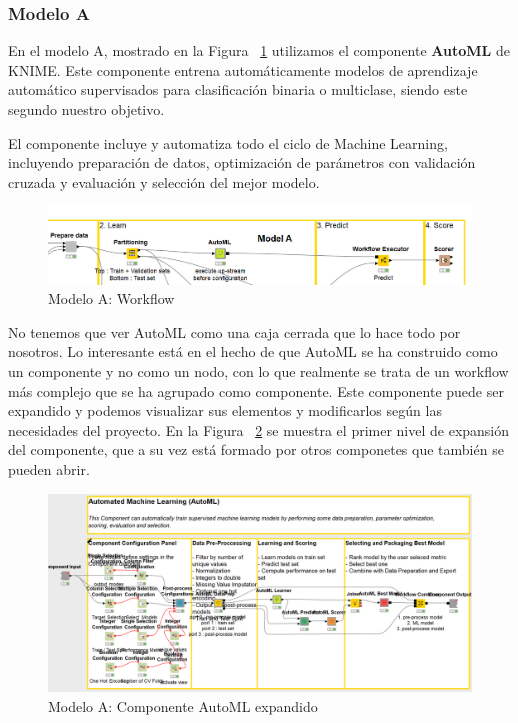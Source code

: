 \subsubsection{Modelo A}

En el modelo A, mostrado en la Figura ~\ref{fig:workflowA1} utilizamos el componente \textbf{AutoML} de KNIME. Este componente entrena automáticamente modelos 
de aprendizaje automático supervisados para clasificación binaria o multiclase, siendo este segundo nuestro objetivo. 

El componente incluye y automatiza todo el ciclo de Machine Learning, incluyendo preparación de datos, optimización 
de parámetros con validación cruzada y evaluación y selección del mejor modelo. 

\begin{figure}[!htb]
	\centering
	\includegraphics[width=1\textwidth]{img/workflowA1.png}
	\caption{Modelo A: Workflow}
	\label{fig:workflowA1}
\end{figure}
\FloatBarrier

No tenemos que ver AutoML como una caja cerrada que lo hace todo por nosotros. Lo interesante está en el hecho de que 
AutoML se ha construido como un componente y no como un nodo, con lo que realmente se trata de un workflow más complejo 
que se ha agrupado como componente. Este componente puede ser expandido y podemos visualizar sus elementos y modificarlos 
según las necesidades del proyecto. En la Figura ~\ref{fig:workflowA3} se muestra el primer nivel de expansión del componente,
que a su vez está formado por otros componetes que también se pueden abrir. 

\begin{figure}[!htb]
	\centering
	\includegraphics[width=1\textwidth]{img/workflowA3.png}
	\caption{Modelo A: Componente AutoML expandido}
	\label{fig:workflowA3}
\end{figure}
\FloatBarrier


